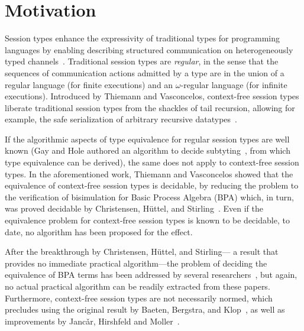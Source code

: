 \section{Motivation}
\label{sec:introduction}

Session types enhance the expressivity of traditional types for
programming languages by enabling describing structured communication
on heterogeneously typed
channels~\cite{DBLP:conf/concur/Honda93,DBLP:conf/esop/HondaVK98,DBLP:conf/parle/TakeuchiHK94}.
%
Traditional session types are \emph{regular}, in the sense that the
sequences of communication actions admitted by a type are in the union
of a regular language (for finite executions) and an $\omega$-regular
language (for infinite executions).
%
Introduced by Thiemann and Vasconcelos, context-free session types
liberate traditional session types from the shackles of tail
recursion, allowing for example, the safe serialization of arbitrary
recursive datatypes~\cite{thiemann2016context}.

If the algorithmic aspects of type equivalence for regular session
types are well known (Gay and Hole authored an algorithm to decide
subtyting~\cite{DBLP:journals/acta/GayH05}, from which type
equivalence can be derived), the same does not apply to context-free
session types.
%
In the aforementioned work, Thiemann and Vasconcelos showed that the
equivalence of context-free session types is decidable, by reducing
the problem to the verification of bisimulation for Basic Process
Algebra (BPA) which, in turn, was proved decidable by Christensen,
H{\"{u}}ttel, and Stirling~\cite{DBLP:journals/iandc/ChristensenHS95}.
%
Even if the equivalence problem for context-free session types is
known to be decidable, to date, no algorithm has been proposed for the
effect.


After the breakthrough by Christensen, H\"uttel, and Stirling--- a
result that provides no immediate practical algorithm---the problem of
deciding the equivalence of BPA terms has been addressed by several
researchers~\cite{DBLP:conf/mfcs/BurkartCS95,DBLP:journals/iandc/ChristensenHS95,janvcar1999techniques},
but again, no actual practical algorithm can be readily extracted from
these papers.
%
Furthermore, context-free session types are not necessarily normed,
which precludes using the original result by Baeten, Bergstra, and
Klop~\cite{baeten1993decidability}, as well as improvements by Janc\v
ar, Hirshfeld and
Moller~\cite{DBLP:journals/tcs/HirshfeldJM96,DBLP:conf/concur/HirshfeldM94}.

